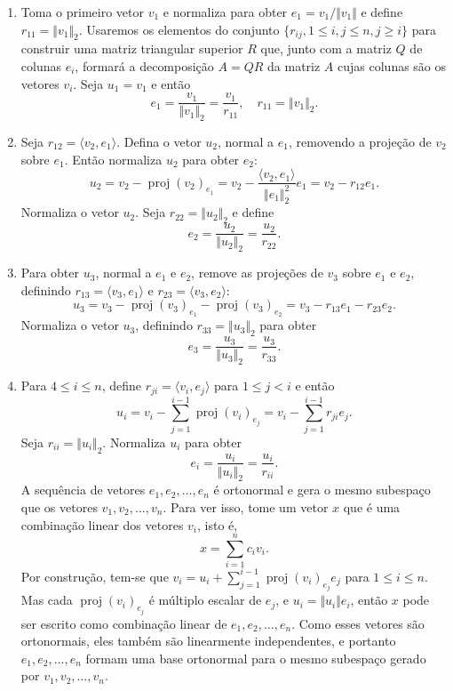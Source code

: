 \documentclass{article}
\DeclareMathOperator{\proj}{proj}
\begin{document}
\begin{tcolorbox}[title=Processo de Gram-Schmidt]
    \begin{enumerate}
        \item Toma o primeiro vetor \(v_1\) e normaliza para obter \(e_1 = v_1/\Vert v_1 \Vert\) e define \(r_{11} = \Vert v_1 \Vert_2\). Usaremos os elementos do conjunto \(\{r_{ij}, 1 \leq i, j \leq n, j \geq i\}\) para construir uma matriz triangular superior \(R\) que, junto com a matriz \(Q\) de colunas \(e_i\), formará a decomposição \(A=QR\) da matriz \(A\) cujas colunas são os vetores \(v_i\). Seja \(u_1 = v_1\) e então
        \[
            e_1 = \frac{v_1}{\Vert v_1 \Vert_2} = \frac{v_1}{r_{11}}, \quad r_{11} = \Vert v_1 \Vert_2.
        \] 
        \item Seja \(r_{12} = \langle v_2, e_1 \rangle\). Defina o vetor \(u_2\), normal a \(e_1\), removendo a projeção de \(v_2\) sobre \(e_1\). Então normaliza \(u_2\) para obter \(e_2\):
        \[
            u_2 = v_2 - \proj(v_2)_{e_1} = v_2 - \frac{\langle v_2, e_1 \rangle}{\Vert e_1 \Vert_2^2} e_1 = v_2 - r_{12} e_1.
        \]
        Normaliza o vetor \(u_2\). Seja \(r_{22} = \Vert u_2 \Vert_2\) e define
        \[
            e_2 = \frac{u_2}{\Vert u_2 \Vert_2} = \frac{u_2}{r_{22}}.
        \]
        \item Para obter \(u_3\), normal a \(e_1\) e \(e_2\), remove as projeções de \(v_3\) sobre \(e_1\) e \(e_2\), definindo \(r_{13} = \langle v_3, e_1 \rangle\) e \(r_{23} = \langle v_3, e_2 \rangle\):
        \[
            u_3 = v_3 - \proj(v_3)_{e_1} - \proj(v_3)_{e_2} = v_3 - r_{13} e_1 - r_{23} e_2.
        \]
        Normaliza o vetor \(u_3\), definindo \(r_{33} = \Vert u_3 \Vert_2\) para obter
        \[
            e_3 = \frac{u_3}{\Vert u_3 \Vert_2} = \frac{u_3}{r_{33}}.
        \]
        \item Para \(4 \leq i \leq n\), define \(r_{ji} = \langle v_i, e_j \rangle\) para \(1 \leq j < i\) e então
        \[
            u_i = v_i - \sum_{j=1}^{i-1} \proj(v_i)_{e_j} = v_i - \sum_{j=1}^{i-1} r_{ji} e_j.
        \]
        Seja \(r_{ii} = \Vert u_i \Vert_2\). Normaliza \(u_i\) para obter
        \[
            e_i = \frac{u_i}{\Vert u_i \Vert_2} = \frac{u_i}{r_{ii}}.
        \]
        A sequência de vetores \(e_1, e_2, \ldots, e_n\) é ortonormal e gera o mesmo subespaço que os vetores \(v_1, v_2, \ldots, v_n\). Para ver isso, tome um vetor \(x\) que é uma combinação linear dos vetores \(v_i\), isto é,
        \[
            x = \sum_{i=1}^n c_i v_i.
        \]
        Por construção, tem-se que \(v_i = u_i + \sum_{j=1}^{i-1} \proj(v_i)_{e_j} e_j\) para \(1 \leq i \leq n\). Mas cada \(\proj(v_i)_{e_j}\) é múltiplo escalar de \(e_j\), e \(u_i = \Vert u_i \Vert e_i\), então \(x\) pode ser escrito como combinação linear de \(e_1, e_2, \ldots, e_n\). Como esses vetores são ortonormais, eles também são linearmente independentes, e portanto \(e_1, e_2, \ldots, e_n\) formam uma base ortonormal para o mesmo subespaço gerado por \(v_1, v_2, \ldots, v_n\).
    \end{enumerate}
\end{tcolorbox}
\end{document}
